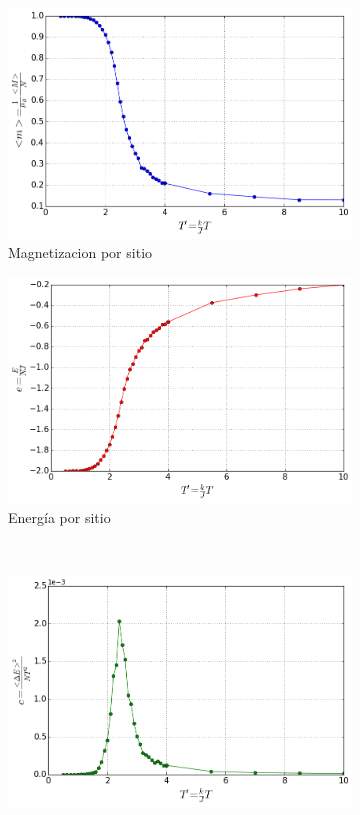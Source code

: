 \documentclass[12pt,a4paper]{article}
\begin{document}
\begin{figure}[H]
\begin{subfigure}[c]{0.45\textwidth}
\centering
\includegraphics[width=\textwidth]{observables/mag_L_8.png}
\caption{Magnetizacion por sitio}
\label{fig:mag_L_8}
\end{subfigure}
\begin{subfigure}[c]{0.45\textwidth}
\centering
\includegraphics[width=\textwidth]{observables/e_L_8.png}
\caption{Energía por sitio}
\label{fig:e_L_8}
\end{subfigure}
\\
\centering
\begin{subfigure}[c]{0.45\textwidth}
\centering
\includegraphics[width=\textwidth]{observables/c_L_8.png}

\end{subfigure}
\end{figure}
\end{document}
